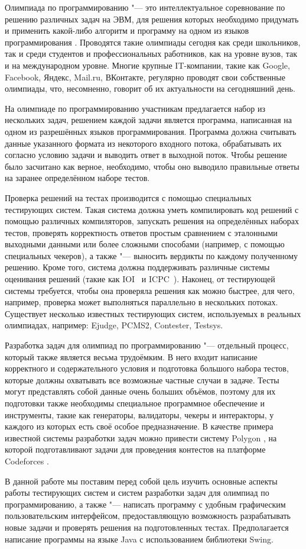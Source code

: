 Олимпиада по программированию "--- это интеллектуальное соревнование по решению различных задач на ЭВМ, для решения которых необходимо придумать и применить какой-либо алгоритм и программу на одном из языков программирования \cite{wiki}. Проводятся такие олимпиады сегодня как среди школьников, так и среди студентов и профессиональных работников, как на уровне вузов, так и на международном уровне. Многие крупные IT-компании, такие как Google, Facebook, Яндекс, Mail.ru, ВКонтакте, регулярно проводят свои собственные олимпиады, что, несомненно, говорит об их актуальности на сегодняшний день.

На олимпиаде по программированию участникам предлагается набор из нескольких задач, решением каждой задачи является программа, написанная на одном из разрешённых языков программирования. Программа должна считывать данные указанного формата из некоторого входного потока, обрабатывать их согласно условию задачи и выводить ответ в выходной поток. Чтобы решение было засчитано как верное, необходимо, чтобы оно выводило правильные ответы на заранее определённом наборе тестов.

Проверка решений на тестах производится с помощью специальных тестирующих систем. Такая система должна уметь компилировать код решений с помощью различных компиляторов, запускать решения на определённых наборах тестов, проверять корректность ответов простым сравнением с эталонными выходными данными или более сложными способами (например, с помощью специальных чекеров), а также "--- выносить вердикты по каждому полученному решению. Кроме того, система должна поддерживать различные системы оценивания решений (такие как IOI~\cite{ioi} и ICPC~\cite{icpc}). Наконец, от тестирующей системы требуется, чтобы она проверяла решения как можно быстрее, для чего, например, проверка может выполняться параллельно в нескольких потоках. Существует несколько известных тестирующих систем, используемых в реальных олимпиадах, например: Ejudge, PCMS2, Contester, Testsys.

Разработка задач для олимпиад по программированию "--- отдельный процесс, который также является весьма трудоёмким. В него входит написание корректного и содержательного условия и подготовка большого набора тестов, которые должны охватывать все возможные частные случаи в задаче. Тесты могут представлять собой данные очень больших объёмов, поэтому для их подготовки также необходимы специальное программное обеспечение и инструменты, такие как генераторы, валидаторы, чекеры и интеракторы, у каждого из которых есть своё особое предназначение. В качестве примера известной системы разработки задач можно привести систему Polygon \cite{polygon}, на которой подготавливают задачи для проведения контестов на платформе Codeforces \cite{codeforces}.

В данной работе мы поставим перед собой цель изучить основные аспекты работы тестирующих систем и систем разработки задач для олимпиад по программированию, а также "--- написать программу с удобным графическим пользовательским интерфейсом, предоставляющую возможность разрабатывать новые задачи и проверять решения на подготовленных тестах. Предполагается написание программы на языке Java с использованием библиотеки Swing.